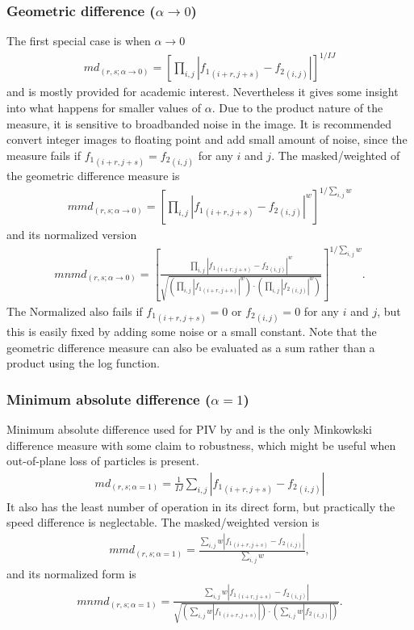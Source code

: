 \documentclass[10pt]{article}
\begin{document}
\subsubsection{Geometric difference ($\alpha\rightarrow 0$)}
The first special case is when $\alpha\rightarrow 0$ 
\begin{align*}
 md_{(r,s;\alpha\rightarrow 0)} = \left[\prod_{i,j} \left|{f_1}_{(i+r,j+s)}-{f_2}_{(i,j)}\right|\right]^{1/IJ}
\end{align*}
and is mostly provided for academic interest.
Nevertheless it gives some insight into what happens for smaller values of $\alpha$.
Due to the product nature of the measure, it is sensitive to broadbanded noise in the image.
It is recommended convert integer images to floating point and add small amount of noise, 
since the measure fails if ${f_1}_{(i+r,j+s)}={f_2}_{(i,j)}$ for any $i$ and $j$.
The masked/weighted of the geometric difference measure is
\begin{align*}
 mmd_{(r,s;\alpha\rightarrow 0)} = \left[\prod_{i,j} \left|{f_1}_{(i+r,j+s)}-{f_2}_{(i,j)}\right|^w\right]^{1/\sum_{i,j} w}
\end{align*}
and its normalized version
\begin{align*}
 mnmd_{(r,s;\alpha\rightarrow 0)} = \left[\frac{\prod_{i,j} \left|{f_1}_{(i+r,j+s)}-{f_2}_{(i,j)}\right|^w}
 {\sqrt{\left(\prod_{i,j} \left|{f_1}_{(i+r,j+s)}\right|^w\right)
   \cdot\left(\prod_{i,j} \left|{f_2}_{(i,j)}\right|^w\right)}}\right]^{1/\sum_{i,j} w}.
\end{align*}
The Normalized also fails if ${f_1}_{(i+r,j+s)}=0$ or ${f_2}_{(i,j)}=0$ for any $i$ and $j$,
but this is easily fixed by adding some noise or a small constant.
Note that the geometric difference measure can also be evaluated as a sum rather than a product using the log function.

\subsubsection{Minimum absolute difference ($\alpha=1$)}
Minimum absolute difference used for PIV by \cite{Gui1997} 
and is the only Minkowkski difference measure with some claim to robustness, 
which might be useful when out-of-plane loss of particles is present.
   \begin{align*}
		md_{(r,s;\alpha=1)} = \frac{1}{IJ}\sum_{i,j} \left|{f_1}_{(i+r,j+s)}-{f_2}_{(i,j)}\right|
   \end{align*}  
It also has the least number of operation in its direct form, but practically the speed difference is neglectable.
The masked/weighted version is
\begin{align*}
		mmd_{(r,s;\alpha=1)} = \frac{\sum_{i,j} w\left|{f_1}_{(i+r,j+s)}-{f_2}_{(i,j)}\right|}{\sum_{i,j} w},
\end{align*}
and its normalized form is
\begin{align*}
		mnmd_{(r,s;\alpha=1)} = \frac{\sum_{i,j} w\left|{f_1}_{(i+r,j+s)}-{f_2}_{(i,j)}\right|}
		{ \sqrt{\left(\sum_{i,j} w\left|{f_1}_{(i+r,j+s)}\right|\right)\cdot\left(\sum_{i,j} w\left|{f_2}_{(i,j)}\right|\right)}}.
\end{align*}
\end{document}
